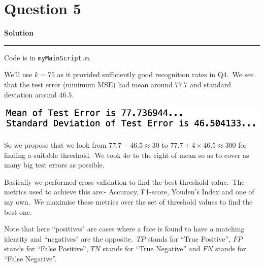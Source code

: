 \documentclass[a4paper,12pt]{article}
\title{\cooltitle{CS663 Assignment-4}}
\author{{\bf Saksham Rathi, Kavya Gupta, Shravan Srinivasa Raghavan} \\
\small Department of Computer Science, \\
Indian Institute of Technology Bombay \\}
\date{}
\newenvironment{solution}[2][]{%
    \begin{mdframed}[linecolor=blue!70!black, linewidth=2pt, roundcorner=10pt, backgroundcolor=yellow!10!white, skipabove=12pt, skipbelow=12pt]%
        \textbf{\large #2}
        \par\noindent\rule{\textwidth}{0.4pt}
}{
    \end{mdframed}
}
\begin{document}
\maketitle

\section*{Question 5}

\begin{solution}{Solution}
	Code is in \texttt{myMainScript.m}.

	We'll use $k = 75$ as it provided sufficiently good recognition rates in Q4.\ We see that the test error (minimum MSE) had mean around $77.7$ and standard deviation around $46.5$.

	\begin{center}
		\includegraphics[scale=0.5]{../images/mean_std-dev.png}
	\end{center}

	So we propose that we look from $77.7 - 46.5 \approx 30$ to $77.7 + 4 \times 46.5 \approx 300$ for finding a suitable threshold.\ We took $4 \sigma$ to the right of mean so as to cover as many big test errors as possible.

	Basically we performed cross-validation to find the best threshold value.\ The metrics used to achieve this are:- Accuracy, F1-score, Youden's Index and one of my own.\ We maximise these metrics over the set of threshold values to find the best one.

	Note that here ``positives" are cases where a face is found to have a matching identity and ``negatives" are the opposite.\ $TP$ stands for ``True Positive'', $FP$ stands for ``False Positive'', $TN$ stands for ``True Negative'' and $FN$ stands for ``False Negative''.


\end{solution}
\end{document}
